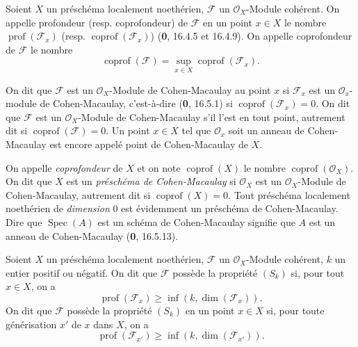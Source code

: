 \begin{definition}[5.7.1]
\label{IV.2.s5.7.1-fr}
Soient $X$ un préschéma localement noethérien, $\mathscr F$ un
$\mathcal O_X$-Module cohérent. On appelle profondeur \textup{(resp.}
coprofondeur\textup{)} de $\mathscr F$ en un point $x\in X$ le nombre
$\operatorname{prof}(\mathscr F_x)$ \textup{(resp.}
$\operatorname{coprof}(\mathscr F_x)$\textup{)} \textup{(\textbf{0}, 16.4.5 et 16.4.9)}. On appelle
coprofondeur de $\mathscr F$ le nombre
\begin{equation}
\operatorname{coprof}(\mathscr F)
=\sup_{x\in X}\operatorname{coprof}(\mathscr F_x).
\tag{5.7.1.1}\label{IV.2.s5.7.1.1-fr}
\end{equation}

On dit que $\mathscr F$ est un $\mathcal O_X$-Module de Cohen-Macaulay au
point $x$ si $\mathscr F_x$ est un $\mathcal O_x$-module de Cohen-Macaulay,
c'est-à-dire \textup{(\textbf{0}, 16.5.1)} si $\operatorname{coprof}(\mathscr F_x)=0$. On dit
que $\mathscr F$ est un $\mathcal O_X$-Module de Cohen-Macaulay s'il l'est
en tout point, autrement dit si $\operatorname{coprof}(\mathscr F)=0$. Un
point $x\in X$ tel que $\mathcal O_x$ soit un anneau de Cohen-Macaulay est
encore appelé point de Cohen-Macaulay de $X$.
\end{definition}

On appelle \emph{coprofondeur} de $X$ et on note $\operatorname{coprof}(X)$
le nombre $\operatorname{coprof}(\mathcal O_X)$. On dit que $X$ est un
\emph{préschéma de Cohen-Macaulay} si $\mathcal O_X$ est un
$\mathcal O_X$-Module de Cohen-Macaulay, autrement dit si
$\operatorname{coprof}(X)=0$. Tout préschéma localement noethérien de
\emph{dimension} 0 est évidemment un préschéma de Cohen-Macaulay. Dire que
$\operatorname{Spec}(A)$ est un schéma de Cohen-Macaulay signifie que $A$
est un anneau de Cohen-Macaulay (\textbf{0}, 16.5.13).

\begin{definition}[5.7.2]
\label{IV.2.s5.7.2-fr}
Soient $X$ un préschéma localement noethérien, $\mathscr F$ un
$\mathcal O_X$-Module cohérent, $k$ un entier positif ou négatif. On dit que
$\mathscr F$ possède la propriété $(S_k)$ si, pour tout $x\in X$, on a
\begin{equation}
\operatorname{prof}(\mathscr F_x)\geq
\inf(k,\dim(\mathscr F_x)).
\tag{5.7.2.1}\label{IV.2.s5.7.2.1-fr}
\end{equation}
On dit que $\mathscr F$ possède la propriété $(S_k)$ en un point $x\in X$
si, pour toute générisation $x'$ de $x$ dans $X$, on a
\begin{equation}
\operatorname{prof}(\mathscr F_{x'})\geq
\inf(k,\dim(\mathscr F_{x'})).
\tag{5.7.2.2}\label{IV.2.s5.7.2.2-fr}
\end{equation}
\end{definition}

